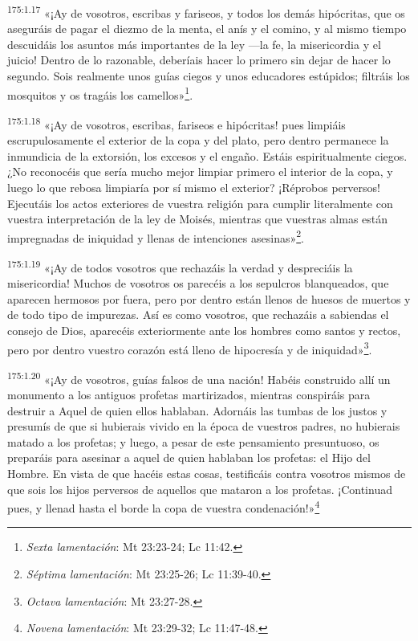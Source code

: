 \par
\textsuperscript{175:1.17} «¡Ay de vosotros, escribas y fariseos, y todos los demás hipócritas, que os aseguráis de pagar el diezmo de la menta, el anís y el comino, y al mismo tiempo descuidáis los asuntos más importantes de la ley ---la fe, la misericordia y el juicio! Dentro de lo razonable, deberíais hacer lo primero sin dejar de hacer lo segundo. Sois realmente unos guías ciegos y unos educadores estúpidos; filtráis los mosquitos y os tragáis los camellos»\footnote{\textit{Sexta lamentación}: Mt 23:23-24; Lc 11:42.}.

\par
\textsuperscript{175:1.18} «¡Ay de vosotros, escribas, fariseos e hipócritas! pues limpiáis escrupulosamente el exterior de la copa y del plato, pero dentro permanece la inmundicia de la extorsión, los excesos y el engaño. Estáis espiritualmente ciegos. ¿No reconocéis que sería mucho mejor limpiar primero el interior de la copa, y luego lo que rebosa limpiaría por sí mismo el exterior? ¡Réprobos perversos! Ejecutáis los actos exteriores de vuestra religión para cumplir literalmente con vuestra interpretación de la ley de Moisés, mientras que vuestras almas están impregnadas de iniquidad y llenas de intenciones asesinas»\footnote{\textit{Séptima lamentación}: Mt 23:25-26; Lc 11:39-40.}.

\par
\textsuperscript{175:1.19} «¡Ay de todos vosotros que rechazáis la verdad y despreciáis la misericordia! Muchos de vosotros os parecéis a los sepulcros blanqueados, que aparecen hermosos por fuera, pero por dentro están llenos de huesos de muertos y de todo tipo de impurezas. Así es como vosotros, que rechazáis a sabiendas el consejo de Dios, aparecéis exteriormente ante los hombres como santos y rectos, pero por dentro vuestro corazón está lleno de hipocresía y de iniquidad»\footnote{\textit{Octava lamentación}: Mt 23:27-28.}.

\par
\textsuperscript{175:1.20} «¡Ay de vosotros, guías falsos de una nación! Habéis construido allí un monumento a los antiguos profetas martirizados, mientras conspiráis para destruir a Aquel de quien ellos hablaban. Adornáis las tumbas de los justos y presumís de que si hubierais vivido en la época de vuestros padres, no hubierais matado a los profetas; y luego, a pesar de este pensamiento presuntuoso, os preparáis para asesinar a aquel de quien hablaban los profetas: el Hijo del Hombre. En vista de que hacéis estas cosas, testificáis contra vosotros mismos de que sois los hijos perversos de aquellos que mataron a los profetas. ¡Continuad pues, y llenad hasta el borde la copa de vuestra condenación!»\footnote{\textit{Novena lamentación}: Mt 23:29-32; Lc 11:47-48.}

